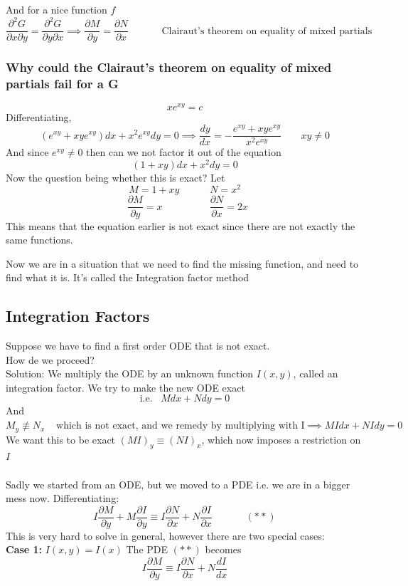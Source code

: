 \documentclass[11pt]{article}
\theoremstyle{definition}
\begin{document}
And for a nice function $f$ 
$$\frac{\partial^2G}{\partial x \partial y} = \frac{\partial^2G}{\partial y \partial x} \implies \frac{\partial M}{\partial y} = \frac{\partial N}{\partial x}\;\;\;\;\;\;\;\;\;\;\;\; \text{Clairaut's theorem on equality of mixed partials}$$

\subsubsection{Why could the Clairaut's theorem on equality of mixed partials fail for a G}
$$xe^{xy} = c$$
Differentiating,
$$(e^{xy}+xye^{xy})dx + x^2e^{xy}dy = 0 \implies \frac{dy}{dx} = -\frac{e^{xy} + xye^{xy}}{x^2e^{xy}} \;\;\;\;\;\;\; xy \neq 0$$
And since $e^{xy} \neq 0$ then can we not factor it out of the equation
$$(1+xy)dx + x^2dy = 0$$
Now the question being whether this is exact?
Let $$M = 1+xy\;\;\;\;\;\;\;\;\;\;\; N = x^2$$
$$\;\;\frac{\partial M}{\partial y} = x\;\;\;\;\;\;\;\;\;\;\;\;\;\;\;\;\; \frac{\partial N}{\partial x} = 2x$$
This means that the equation earlier is not exact since there are not exactly the same functions.

Now we are in a situation that we need to find the missing function, and need to find what it is. It's called the Integration factor method
\subsection{Integration Factors}
Suppose we have to find a first order ODE that is not exact.\\
How de we proceed?\\
Solution: We multiply the ODE by an unknown function $I(x,y)$, called an integration factor. We try to make the new ODE exact
$$\text{i.e.} \;\;\; Mdx + Ndy = 0$$
And $M_y \not\equiv N_x \;\;\;\; \text{which is not exact, and we remedy by multiplying with I} \implies MIdx + NIdy = 0$\\
We want this to be exact  $(MI)_y \equiv (NI)_x$, which now imposes a restriction on $I$\\\\
Sadly we started from an ODE, but we moved to a PDE i.e. we are in a bigger mess now. Differentiating:
$$I\frac{\partial M}{\partial y} + M\frac{\partial I}{\partial y} \equiv I\frac{\partial N}{\partial x} + N\frac{\partial I}{\partial x} \;\;\;\;\;\;\;\;\;\;\;\; (**)$$
This is very hard to solve in general, however there are two special cases:\\
\textbf{Case 1:}
$I(x,y) = I(x)$ The PDE $(**)$ becomes
$$I\frac{\partial M}{\partial y} \equiv I\frac{\partial N}{\partial x} + N\frac{dI}{dx}$$
\end{document}
